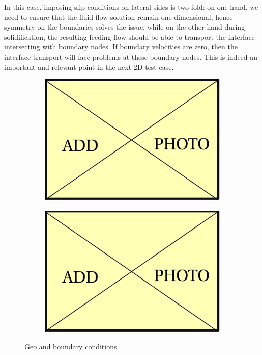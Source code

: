 In this case, imposing slip conditions on lateral sides is two-fold: on one hand, we need to ensure that the fluid flow solution
remain one-dimensional, hence symmetry on the boundaries solves the issue, while on the other hand during solidification, 
the resulting feeding flow should be able to transport the interface intersecting with boundary nodes. If boundary velocities
are zero, then the interface transport will face problems at these boundary nodes. This is indeed an important and relevant point 
in the next 2D test case.

%
\begin{figure}[htbp]
\centering
  \begin{subfigure}[t]{0.45\textwidth}
    \centering
	\includegraphics[width=\textwidth]{Misc/dummy.pdf}
	\caption{}
    \label{fig:1d_alsi7_geo}
  \end{subfigure}
   \begin{subfigure}[t]{0.45\textwidth}
    \centering
	\includegraphics[width=\textwidth]{Misc/dummy.pdf}
	\caption{}
    \label{fig:1d_alsi7_bc}
  \end{subfigure}
\caption{Geo and boundary conditions} 
\label{fig:}
\end{figure}
%
